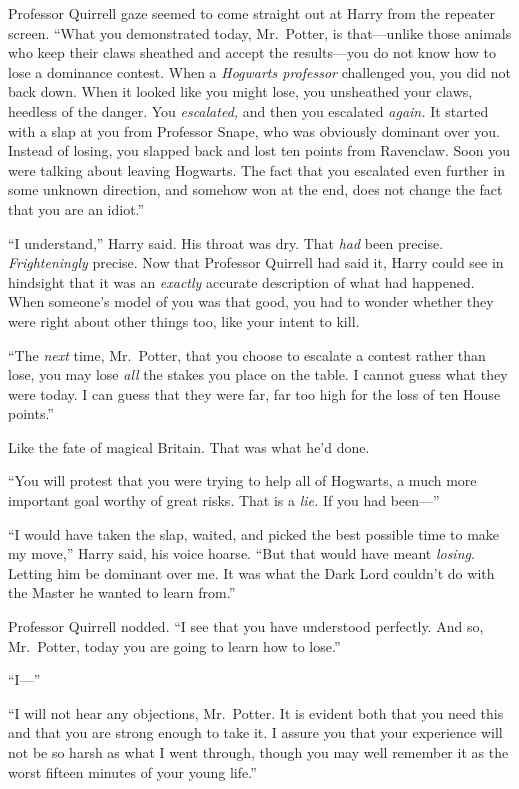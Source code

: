 Professor Quirrell gaze seemed to come straight out at Harry from the
repeater screen. ``What you demonstrated today, Mr.~Potter, is
that---unlike those animals who keep their claws sheathed and accept the
results---you do not know how to lose a dominance contest. When a
\emph{Hogwarts professor} challenged you, you did not back down. When it
looked like you might lose, you unsheathed your claws, heedless of the
danger. You \emph{escalated,} and then you escalated \emph{again.} It
started with a slap at you from Professor Snape, who was obviously
dominant over you. Instead of losing, you slapped back and lost ten
points from Ravenclaw. Soon you were talking about leaving Hogwarts. The
fact that you escalated even further in some unknown direction, and
somehow won at the end, does not change the fact that you are an
idiot.''

``I understand,'' Harry said. His throat was dry. That \emph{had} been
precise. \emph{Frighteningly} precise. Now that Professor Quirrell had
said it, Harry could see in hindsight that it was an \emph{exactly}
accurate description of what had happened. When someone's model of you
was that good, you had to wonder whether they were right about other
things too, like your intent to kill.

``The \emph{next} time, Mr.~Potter, that you choose to escalate a
contest rather than lose, you may lose \emph{all} the stakes you place
on the table. I cannot guess what they were today. I can guess that they
were far, far too high for the loss of ten House points.''

Like the fate of magical Britain. That was what he'd done.

``You will protest that you were trying to help all of Hogwarts, a much
more important goal worthy of great risks. That is a \emph{lie.} If you
had been---''

``I would have taken the slap, waited, and picked the best possible time
to make my move,'' Harry said, his voice hoarse. ``But that would have
meant \emph{losing}. Letting him be dominant over me. It was what the
Dark Lord couldn't do with the Master he wanted to learn from.''

Professor Quirrell nodded. ``I see that you have understood perfectly.
And so, Mr.~Potter, today you are going to learn how to lose.''

``I---''

``I will not hear any objections, Mr.~Potter. It is evident both that
you need this and that you are strong enough to take it. I assure you
that your experience will not be so harsh as what I went through, though
you may well remember it as the worst fifteen minutes of your young
life.''

